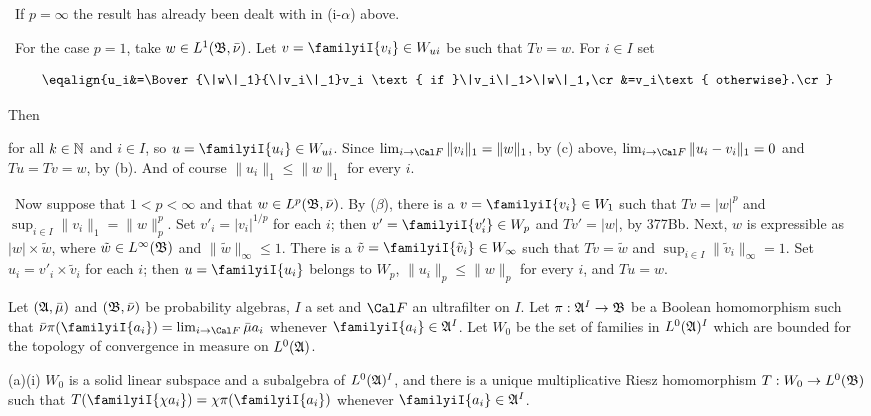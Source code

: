 {\medskip

\grheada\ If $p=\infty$ the result has already been dealt
with in (i-$\alpha$) above.

\medskip

\qquad\grheadb\ For the case $p=1$, take $w\in L^1(\frak B,\bar\nu)$.
Let $v=\familyiI{v_i}\in W_{ui}$ be such that $Tv=w$.   For $i\in I$ set

$$\eqalign{u_i&=\Bover{\|w\|_1}{\|v_i\|_1}v_i
  \text{ if }\|v_i\|_1>\|w\|_1,\cr
&=v_i\text{ otherwise}.\cr}$$

\noindent Then


\noindent for all $k\in\Bbb N$ and $i\in I$, so
$u=\familyiI{u_i}\in W_{ui}$.   Since $\lim_{i\to\Cal F}\|v_i\|_1=\|w\|_1$,
by (c) above, $\lim_{i\to\Cal F}\|u_i-v_i\|_1=0$ and $Tu=Tv=w$, by (b).
And of course $\|u_i\|_1\le\|w\|_1$ for every $i$.

\medskip

\qquad\grheadc\ Now suppose that $1<p<\infty$ and that
$w\in L^p(\frak B,\bar\nu)$.   By ($\beta$), there is a
$v=\familyiI{v_i}\in W_1$ such that $Tv=|w|^p$ and
$\sup_{i\in I}\|v_i\|_1=\|w\|_p^p$.   Set $v'_i=|v_i|^{1/p}$ for each
$i$;  then $v'=\familyiI{v'_i}\in W_p$ and $Tv'=|w|$, by 377Bb.   Next, $w$
is expressible as $|w|\times\tilde w$, where
$\tilde w\in L^{\infty}(\frak B)$ and $\|\tilde w\|_{\infty}\le 1$.
There is a $\tilde v=\familyiI{\tilde v_i}\in W_{\infty}$ such that
$T\tilde v=\tilde w$ and $\sup_{i\in I}\|\tilde v_i\|_{\infty}=1$.
Set $u_i=v'_i\times\tilde v_i$ for each $i$;  then $u=\familyiI{u_i}$
belongs to $W_p$, $\|u_i\|_p\le\|w\|_p$ for every $i$, and $Tu=w$.
}%

 Let $(\frak A,\bar\mu)$ and $(\frak B,\bar\nu)$
be probability algebras, $I$ a set and $\Cal F$ an ultrafilter on $I$.
Let $\pi:\frak A^I\to\frak B$ be a Boolean homomorphism such that
$\bar\nu\pi(\familyiI{a_i})=\lim_{i\to\Cal F}\bar\mu a_i$ whenever
$\familyiI{a_i}\in\frak A^I$.   Let $W_0$ be the set of families in
$L^0(\frak A)^I$ which are bounded for the topology of convergence in
measure on $L^0(\frak A)$.

(a)(i) $W_0$ is a solid linear subspace and a subalgebra of
$L^0(\frak A)^I$,
and there is a unique multiplicative Riesz homomorphism
$T:W_0\to L^0(\frak B)$ such that
$T(\familyiI{\chi a_i})=\chi\pi(\familyiI{a_i})$ whenever
$\familyiI{a_i}\in\frak A^I$.

